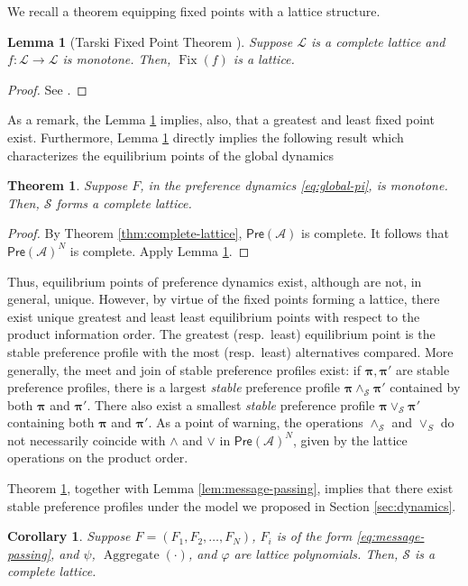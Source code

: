 \documentclass[conference]{ieeeconf}
\newcommand{\A}{\mathcal{A}}
\renewcommand{\SS}{\mathcal{S}}
\newcommand{\Pref}{\mathsf{Pre}}
\renewcommand{\L}{\mathcal{L}}
\newcommand{\profile}{\boldsymbol{\pi}}
\newcommand{\join}{\vee}
\newcommand{\meet}{\wedge}
\DeclareMathOperator{\Fix}{Fix}
\DeclareMathOperator{\Aggregate}{Aggregate}
\newtheorem{theorem}{Theorem}
\newtheorem{lemma}{Lemma}
\newtheorem{corollary}{Corollary}
\begin{document}
We recall a theorem equipping fixed points with a lattice structure.
\begin{lemma}[Tarski Fixed Point Theorem \cite{tarski1955}] \label{lem:tfpt}
    Suppose $\L$ is a complete lattice and $f: \L \to \L$ is monotone. Then, $\Fix(f)$ is a lattice.
\end{lemma}
\begin{proof}
    See \cite[Theorem 12.2]{roman2008}. 
\end{proof}

As a remark, the Lemma \ref{lem:tfpt} implies, also, that a greatest and least fixed point exist. Furthermore, Lemma \ref{lem:tfpt} directly implies the following result which characterizes the equilibrium points of the global dynamics

\begin{theorem} \label{thm:dynamics}
    Suppose $F$, in the preference dynamics \eqref{eq:global-pi}, is monotone. Then, $\SS$ forms a complete lattice.
\end{theorem}
\begin{proof}
    By Theorem \ref{thm:complete-lattice}, $\Pref(\A)$ is complete. It follows that $\Pref(\A)^N$ is complete. Apply Lemma \ref{lem:tfpt}.
\end{proof}

Thus, equilibrium points of preference dynamics exist, although are not, in general, unique. However, by virtue of the fixed points forming a lattice, there exist unique greatest and least least equilibrium points with respect to the product information order. The greatest (resp.~least) equilibrium point is the stable preference profile with the most (resp.~least) alternatives compared. More generally, the meet and join of stable preference profiles exist: if $\profile, \profile'$ are stable preference profiles, there is a largest \emph{stable} preference profile $\profile \meet_{\SS} \profile'$ contained by both $\profile$ and $\profile'$. There also exist a smallest \emph{stable} preference profile $\profile \join_{\SS} \profile'$ containing both $\profile$ and $\profile'$. As a point of warning, the operations $\meet_\SS$ and $\join_S$ do not necessarily coincide with $\meet$ and $\join$ in $\Pref(\A)^N$, given by the lattice operations on the product order.

Theorem \ref{thm:dynamics}, together with Lemma \ref{lem:message-passing}, implies that there exist stable preference profiles under the model we proposed in Section \ref{sec:dynamics}.

\begin{corollary} \label{cor:dynamics}
    Suppose $F = (F_1,F_2,\dots,F_N)$, $F_i$ is of the form \eqref{eq:message-passing}, and $\psi$, $\Aggregate(\cdot)$, and $\varphi$ are lattice polynomials. Then, $\SS$ is a complete lattice.
\end{corollary}
\end{document}
